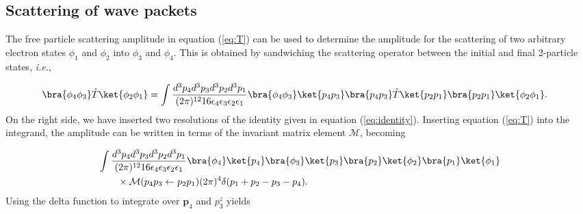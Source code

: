 \documentclass{article}
\begin{document}
\subsection{Scattering of wave packets} 
\label{sec:wavepackets}


The free particle scattering amplitude in equation (\ref{eq:T}) can be used to
determine the amplitude for the scattering of two arbitrary electron states
$\phi_1$ and $\phi_2$ into $\phi_3$ and $\phi_4$.
This is obtained by sandwiching the scattering operator between the initial and
final 2-particle states, \textit{i.e.},

\begin{equation} 
  \label{eq:amp} 
  \begin{aligned}
    &\bra{\phi_4\phi_3} \hat{T} \ket{\phi_2\phi_1}
    = 
    \int \frac{d^3p_4d^3p_3d^3p_2d^3p_1} {(2\pi)^{12}
    16\epsilon_4\epsilon_3\epsilon_2\epsilon_1}
    \bra{\phi_4\phi_3}\ket{p_4p_3} \bra{p_4p_3}\hat{T}\ket{p_2p_1}
    \bra{p_2p_1}\ket{\phi_2\phi_1}.
\end{aligned} 
\end{equation}
%
On the right side, we have inserted two resolutions of the identity given in
equation (\ref{eq:identity}). Inserting equation (\ref{eq:T}) into the
integrand, the amplitude can be written in terms of the invariant matrix
element $\mathcal{M}$, becoming

\begin{equation} 
  \label{eq:ampPlugInM} 
  \begin{aligned}
    &\int\frac{d^3p_4d^3p_3d^3p_2d^3p_1} {(2\pi)^{12}
    16\epsilon_4\epsilon_3\epsilon_2\epsilon_1} \bra{\phi_4}\ket{p_4}
    \bra{\phi_3}\ket{p_3} \bra{p_2}\ket{\phi_2} \bra{p_1}\ket{\phi_1}
    \\&\qquad\times 
    \mathcal{M}(p_4p_3\leftarrow p_2p_1) 
    (2\pi)^4\delta(p_1 + p_2 - p_3 - p_4).  
\end{aligned} 
\end{equation}
%
Using the delta function to integrate over $\mathbf{p}_4$ and $p_3^z$ yields
\end{document}
